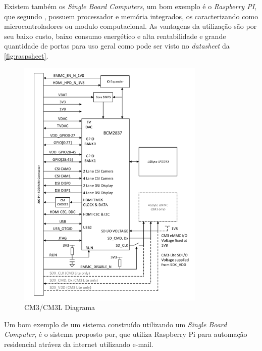 Existem também os \textit{Single Board Computers}, um bom exemplo é o \textit{Raspberry PI}, que segundo , possuem processador e memória integrados, os caracterizando como microcontroladores ou modulo computacional. As vantagens da utilização são por seu baixo custo, baixo consumo energético e alta rentabilidade e grande quantidade de portas para uso geral como pode ser visto no \textit{datasheet} da \autoref{fig:raspsheet}.
 \begin{figure}[H]
	\centering
    	\caption{\label{fig:raspsheet} CM3/CM3L Diagrama }
		\includegraphics[width = 0.8\textwidth]	{resources/raspsheet}
\end{figure}

Um bom exemplo de um sistema construído utilizando um \textit{Single Board Computer}, é o sistema proposto por, que utiliza Raspberry Pi para automação residencial atrávez da internet utilizando e-mail.



